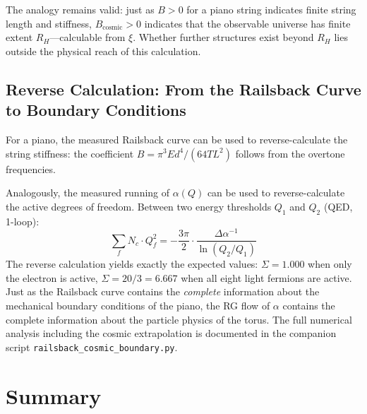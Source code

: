The analogy remains valid: just as $B > 0$ for a piano string indicates finite string length and stiffness, $B_\text{cosmic} > 0$ indicates that the observable universe has finite extent $R_H$---calculable from $\xi$. Whether further structures exist beyond $R_H$ lies outside the physical reach of this calculation.

\subsection{Reverse Calculation: From the Railsback Curve to Boundary Conditions}

For a piano, the measured Railsback curve can be used to reverse-calculate the string stiffness: the coefficient $B = \pi^3 E d^4 / (64 T L^2)$ follows from the overtone frequencies.

Analogously, the measured running of $\alpha(Q)$ can be used to reverse-calculate the active degrees of freedom. Between two energy thresholds $Q_1$ and $Q_2$ (QED, 1-loop):
\begin{equation}
	\sum_f N_c \cdot Q_f^2 = -\frac{3\pi}{2} \cdot \frac{\Delta\alpha^{-1}}{\ln(Q_2/Q_1)}
\end{equation}
The reverse calculation yields exactly the expected values: $\Sigma = 1.000$ when only the electron is active, $\Sigma = 20/3 = 6.667$ when all eight light fermions are active. Just as the Railsback curve contains the \emph{complete} information about the mechanical boundary conditions of the piano, the RG flow of $\alpha$ contains the complete information about the particle physics of the torus. The full numerical analysis including the cosmic extrapolation is documented in the companion script \texttt{railsback\_cosmic\_boundary.py}.

\section{Summary}

